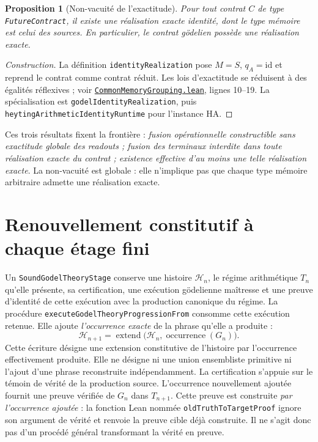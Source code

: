 \documentclass[11pt,a4paper]{article}
\newcommand{\code}[1]{\nolinkurl{#1}}
\newcommand{\SourceAt}[3]{\href{https://github.com/JohnDoe-collab-stack/relational-perimeter/blob/1e5aeda745559d62a3819bb3213da7fce3c31ad1/#1\#L#2}{\nolinkurl{#3}}}
\newtheorem{proposition}[theoreme]{Proposition}
\theoremstyle{remark}
\begin{document}
\begin{proposition}[Non-vacuité de l'exactitude]
Pour tout contrat $C$ de type \code{FutureContract}, il existe une
réalisation exacte identité, dont le type mémoire est celui des sources.
En particulier, le contrat gödelien possède une réalisation exacte.
\end{proposition}
\begin{proof}[Construction]
La définition \code{identityRealization} pose
$M=S$, $q_A=\mathrm{id}$ et reprend le contrat comme contrat réduit.
Les lois d'exactitude se réduisent à des égalités réflexives ; voir
\SourceAt{RelationalPerimeter/Constitution/Continuation/CommonMemoryGrouping.lean}{10-L19}{CommonMemoryGrouping.lean},
lignes 10--19. La spécialisation est \code{godelIdentityRealization},
puis \code{heytingArithmeticIdentityRuntime} pour l'instance HA.
\end{proof}

Ces trois résultats fixent la frontière : \emph{fusion opérationnelle
constructible sans exactitude globale des readouts ; fusion des terminaux
interdite dans toute réalisation exacte du contrat ; existence effective
d'au moins une telle réalisation exacte}. La non-vacuité est globale : elle
n'implique pas que chaque type mémoire arbitraire admette une réalisation
exacte.

\section{Renouvellement constitutif à chaque étage fini}
\label{sec:progression}

Un \code{SoundGodelTheoryStage} conserve une histoire $\mathcal H_n$, le
régime arithmétique $T_n$ qu'elle présente, sa certification,
une exécution gödelienne maîtresse et une preuve d'identité de cette exécution
avec la production canonique du régime. La procédure
\code{executeGodelTheoryProgressionFrom} consomme cette exécution retenue.
Elle ajoute \emph{l'occurrence exacte} de la phrase qu'elle a produite :
\begin{equation}\label{eq:successor}
\mathcal H_{n+1}
  =\operatorname{extend}\bigl(\mathcal H_n,
    \operatorname{occurrence}(G_n)\bigr).
\end{equation}
Cette écriture désigne une extension constitutive de l'histoire par
l'occurrence effectivement produite. Elle ne désigne ni une union
ensembliste primitive ni l'ajout d'une phrase reconstruite indépendamment.
La certification s'appuie sur le témoin de vérité de la production source.
L'occurrence nouvellement ajoutée fournit une preuve vérifiée de $G_n$
dans $T_{n+1}$. Cette preuve est construite \emph{par l'occurrence ajoutée}
: la fonction Lean nommée \code{oldTruthToTargetProof} ignore son argument
de vérité et renvoie la preuve cible déjà construite. Il ne s'agit donc
pas d'un procédé général transformant la vérité en preuve.
\end{document}

